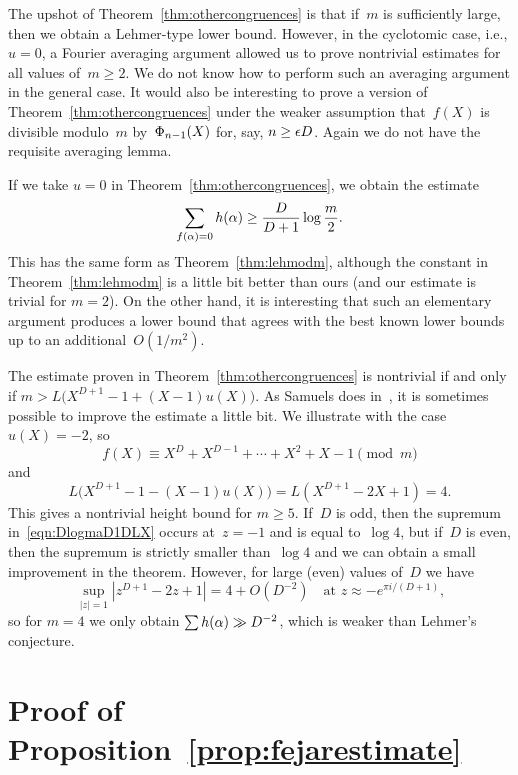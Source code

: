 \documentclass[12pt,reqno]{amsart}
\begin{document}
\begin{remark}
The upshot of Theorem~\ref{thm:othercongruences} is that if~$m$ is
sufficiently large, then we obtain a Lehmer-type lower bound. However,
in the cyclotomic case, i.e., $u=0$, a Fourier averaging argument allowed us to
prove nontrivial estimates for all values of~$m\ge2$.  We do not know
how to perform such an averaging argument in the general case. It
would also be interesting to prove a version of
Theorem~\ref{thm:othercongruences} under the weaker assumption
that~$f(X)$ is divisible modulo~$m$ by~$\Phi_{n-1}(X)$ for, say, $n\ge\epsilon
D$. Again we do not have the requisite averaging lemma.
\end{remark}

\begin{remark}
If we take $u=0$ in  Theorem~\ref{thm:othercongruences}, we obtain
the estimate
\[
  \sum_{f(\alpha)=0} h(\alpha) \ge \frac{D}{D+1}\log\frac{m}{2}.
\]
This has the same form as Theorem~\ref{thm:lehmodm}, although the
constant in Theorem~\ref{thm:lehmodm} is a little bit better than ours
(and our estimate is trivial for $m=2$).  On the other hand, it is
interesting that such an elementary argument produces a lower bound
that agrees with the best known lower
bounds~\cite{BoDoMo,BoHaMo,DuMo,GaIsMoPiWi} up to an
additional~$O(1/m^2)$.
\end{remark}

\begin{remark}
The estimate proven in Theorem~\ref{thm:othercongruences} is
nontrivial if and only if $m>L\bigl(X^{D+1}-1+(X-1)u(X)\bigr)$.  As
Samuels does in~\cite{MR2313990}, it is sometimes possible to improve
the estimate a little bit. We illustrate with the case $u(X)=-2$, so
\[
  f(X)\equiv X^D+X^{D-1}+\cdots+X^2+X-1\pmod{m}
\]
and
\[
  L\bigl(X^{D+1}-1-(X-1)u(X)\bigr)  =  L(X^{D+1}-2X+1)=4.
\]
This gives a nontrivial height bound for $m\ge5$.  If~$D$ is odd,
then the supremum in~\eqref{eqn:DlogmaD1DLX} occurs at~$z=-1$ and is
equal to~$\log4$, but if~$D$ is even, then the supremum is strictly
smaller than~$\log4$ and we can obtain a small improvement in the
theorem.  However, for large (even) values of~$D$ we have
\[
   \sup_{|z|=1}  |z^{D+1}-2z+1| = 4+O(D^{-2})
  \quad \text{at $z\approx -e^{\pi i/(D+1)}$,}
\]
so for $m=4$ we only obtain $\sum h(\alpha) \gg D^{-2}$, which is weaker
than Lehmer's conjecture.
\end{remark}

\section{Proof of Proposition~\ref{prop:fejarestimate}}
\label{section:fejarproof}
\end{document}
